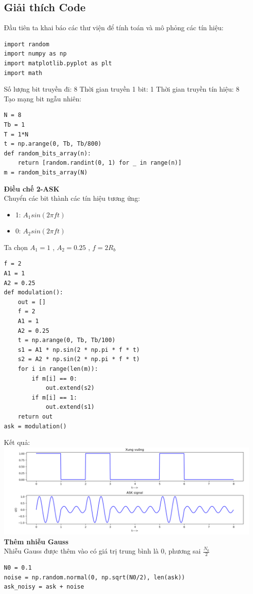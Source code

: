 \subsection{Giải thích Code}
Đầu tiên ta khai báo các thư viện để tính toán và mô phỏng các tín hiệu:
\begin{lstlisting}
import random
import numpy as np
import matplotlib.pyplot as plt
import math
\end{lstlisting}
Số lượng bit truyền đi: 8
Thời gian truyền 1 bit: 1
Thời gian truyền tín hiệu: 8
Tạo mạng bit ngẫu nhiên:
\begin{lstlisting}
N = 8      
Tb = 1     
T = 1*N    
t = np.arange(0, Tb, Tb/800)
def random_bits_array(n): 
    return [random.randint(0, 1) for _ in range(n)]
m = random_bits_array(N)
\end{lstlisting}
\textbf{Điều chế 2-ASK} \\
Chuyển các bit thành các tín hiệu tương ứng: \\ 
\begin{itemize}
    \item 1: $A_{1}sin(2\pi f t)$
    \item 0: $A_{2}sin(2\pi ft)$
\end{itemize}
Ta chọn $A_{1} = 1$ , $A_{2} = 0.25$ , $f = 2R_{b}$
\begin{lstlisting}
f = 2    
A1 = 1    
A2 = 0.25 
def modulation():
    out = []
    f = 2    
    A1 = 1    
    A2 = 0.25 
    t = np.arange(0, Tb, Tb/100)
    s1 = A1 * np.sin(2 * np.pi * f * t)
    s2 = A2 * np.sin(2 * np.pi * f * t)
    for i in range(len(m)):
        if m[i] == 0:
            out.extend(s2)
        if m[i] == 1:
            out.extend(s1)
    return out
ask = modulation()
\end{lstlisting}
Kết quả:\\
\includegraphics[width=\textwidth]{Img/ASK_f.png}
\\
\textbf{Thêm nhiễu Gauss} \\ 
Nhiễu Gauss được thêm vào có giá trị trung bình là 0, phương sai $\frac{N_{0}}{2}$
\begin{lstlisting}
N0 = 0.1
noise = np.random.normal(0, np.sqrt(N0/2), len(ask)) 
ask_noisy = ask + noise
\end{lstlisting}

